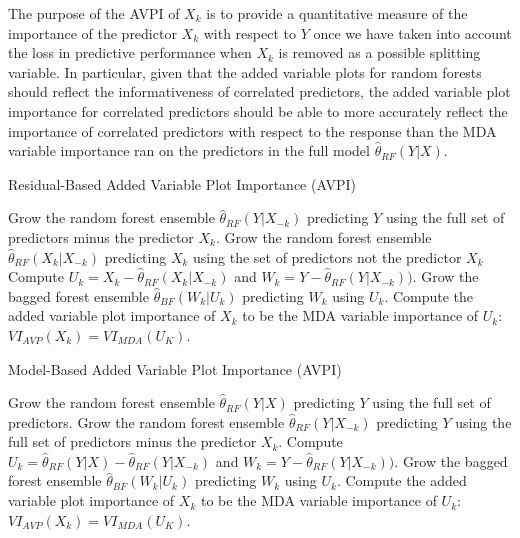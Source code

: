 \documentclass[12pt,twoside]{reedthesis}
\theoremstyle{definition}
\theoremstyle{definition}
\theoremstyle{definition}
\theoremstyle{remark}
\begin{document}
The purpose of the AVPI of \(X_k\) is to provide a quantitative measure
of the importance of the predictor \(X_k\) with respect to \(Y\) once we
have taken into account the loss in predictive performance when \(X_k\)
is removed as a possible splitting variable. In particular, given that
the added variable plots for random forests should reflect the
informativeness of correlated predictors, the added variable plot
importance for correlated predictors should be able to more accurately
reflect the importance of correlated predictors with respect to the
response than the MDA variable importance ran on the predictors in the
full model \(\hat{\theta}_{RF}(Y|X)\). \par
\begin{algorithm}
    \caption{Residual-Based Added Variable Plot Importance (AVPI)} \label{added variable importance}
      \begin{algorithmic}[1]
            \State Grow the random forest ensemble $\hat{\theta}_{RF}(Y|X_{-k})$ predicting $Y$ using the full set of predictors minus the predictor $X_k$.
            \State Grow the random forest ensemble $\hat{\theta}_{RF}(X_k|X_{-k})$ predicting $X_k$ using the set of predictors not the predictor $X_k$
            \State Compute $U_k=X_k-\hat{\theta}_{RF}(X_k|X_{-k})$ and $W_k=Y-\hat{\theta}_{RF}(Y|X_{-k})).$
            \State Grow the bagged forest ensemble $\hat{\theta}_{BF}(W_k|U_k)$ predicting $W_k$ using $U_k$. 
            \State Compute the added variable plot importance of $X_k$ to be the MDA variable importance of $U_k$: $VI_{AVP}(X_k)=VI_{MDA}(U_K)$.
          \EndFor
      \end{algorithmic}
  \end{algorithm}
\begin{algorithm}
    \caption{Model-Based Added Variable Plot Importance (AVPI)} \label{added variable importance}
      \begin{algorithmic}[1]
          \State Grow the random forest ensemble $\hat{\theta}_{RF}(Y|X)$ predicting $Y$ using the full set of predictors. 
            \State Grow the random forest ensemble $\hat{\theta}_{RF}(Y|X_{-k})$ predicting $Y$ using the full set of predictors minus the predictor $X_k$.
            \State Compute $U_k=\hat{\theta}_{RF}(Y|X)-\hat{\theta}_{RF}(Y|X_{-k})$ and $W_k=Y-\hat{\theta}_{RF}(Y|X_{-k})).$
            \State Grow the bagged forest ensemble $\hat{\theta}_{BF}(W_k|U_k)$ predicting $W_k$ using $U_k$. 
            \State Compute the added variable plot importance of $X_k$ to be the MDA variable importance of $U_k$: $VI_{AVP}(X_k)=VI_{MDA}(U_K)$.
          \EndFor
      \end{algorithmic}
  \end{algorithm}
\end{document}
